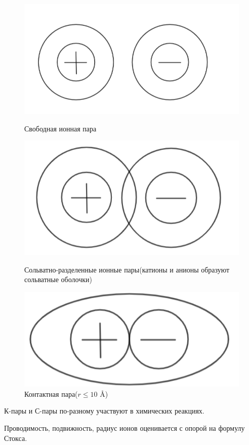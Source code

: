 
\begin{lecture}
	\begin{lecSection}
			\begin{figure}[H]
			\begin{minipage}[h]{0.26\linewidth}
				\centering\includegraphics[width=\linewidth]{lecture_06/pic1}
				\caption{Свободная ионная пара}
			\end{minipage}
			\hfill
			\begin{minipage}[h]{0.30\linewidth}
				\centering\includegraphics[width=\linewidth]{lecture_06/pic2}
				\caption{Сольватно-разделенные ионные пары(катионы и анионы образуют сольватные оболочки)}
			\end{minipage}
			\hfill
			\begin{minipage}[h]{0.28\linewidth}
				\centering\includegraphics[width=\linewidth]{lecture_06/pic3}
				\caption{Контактная пара($r \leq 10$ \AA)}
			\end{minipage}
	\end{figure}
К-пары и С-пары по-разному участвуют в химических реакциях.
\par Проводимость, подвижность, радиус ионов оценивается с опорой на формулу Стокса.


\end{lecSection}
\end{lecture}
